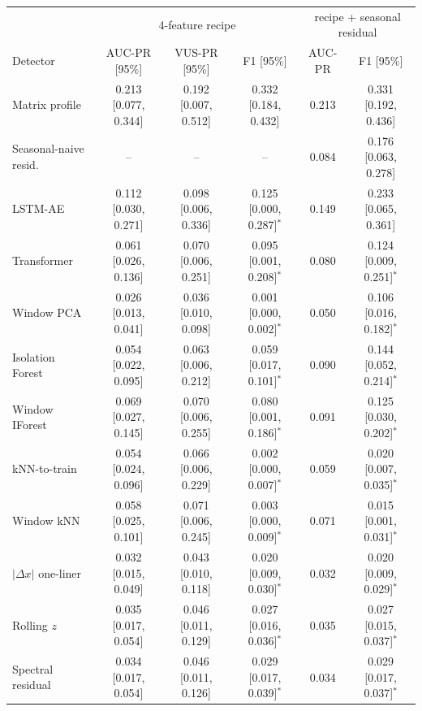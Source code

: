 \begin{tabular}{lccccc}
\toprule
 & \multicolumn{3}{c}{4-feature recipe} & \multicolumn{2}{c}{recipe + seasonal residual} \\
Detector & AUC-PR [95\%] & VUS-PR [95\%] & F1 [95\%] & AUC-PR & F1 [95\%] \\
\midrule
Matrix profile & 0.213 [0.077, 0.344] & 0.192 [0.007, 0.512] & 0.332 [0.184, 0.432] & 0.213 & 0.331 [0.192, 0.436] \\
Seasonal-naive resid. & -- & -- & -- & 0.084 & 0.176 [0.063, 0.278] \\
LSTM-AE & 0.112 [0.030, 0.271] & 0.098 [0.006, 0.336] & 0.125 [0.000, 0.287]$^\ast$ & 0.149 & 0.233 [0.065, 0.361] \\
Transformer & 0.061 [0.026, 0.136] & 0.070 [0.006, 0.251] & 0.095 [0.001, 0.208]$^\ast$ & 0.080 & 0.124 [0.009, 0.251]$^\ast$ \\
Window PCA & 0.026 [0.013, 0.041] & 0.036 [0.010, 0.098] & 0.001 [0.000, 0.002]$^\ast$ & 0.050 & 0.106 [0.016, 0.182]$^\ast$ \\
Isolation Forest & 0.054 [0.022, 0.095] & 0.063 [0.006, 0.212] & 0.059 [0.017, 0.101]$^\ast$ & 0.090 & 0.144 [0.052, 0.214]$^\ast$ \\
Window IForest & 0.069 [0.027, 0.145] & 0.070 [0.006, 0.255] & 0.080 [0.001, 0.186]$^\ast$ & 0.091 & 0.125 [0.030, 0.202]$^\ast$ \\
kNN-to-train & 0.054 [0.024, 0.096] & 0.066 [0.006, 0.229] & 0.002 [0.000, 0.007]$^\ast$ & 0.059 & 0.020 [0.007, 0.035]$^\ast$ \\
Window kNN & 0.058 [0.025, 0.101] & 0.071 [0.006, 0.245] & 0.003 [0.000, 0.009]$^\ast$ & 0.071 & 0.015 [0.001, 0.031]$^\ast$ \\
$|\Delta x|$ one-liner & 0.032 [0.015, 0.049] & 0.043 [0.010, 0.118] & 0.020 [0.009, 0.030]$^\ast$ & 0.032 & 0.020 [0.009, 0.029]$^\ast$ \\
Rolling $z$ & 0.035 [0.017, 0.054] & 0.046 [0.011, 0.129] & 0.027 [0.016, 0.036]$^\ast$ & 0.035 & 0.027 [0.015, 0.037]$^\ast$ \\
Spectral residual & 0.034 [0.017, 0.054] & 0.046 [0.011, 0.126] & 0.029 [0.017, 0.039]$^\ast$ & 0.034 & 0.029 [0.017, 0.037]$^\ast$ \\
\bottomrule
\end{tabular}
